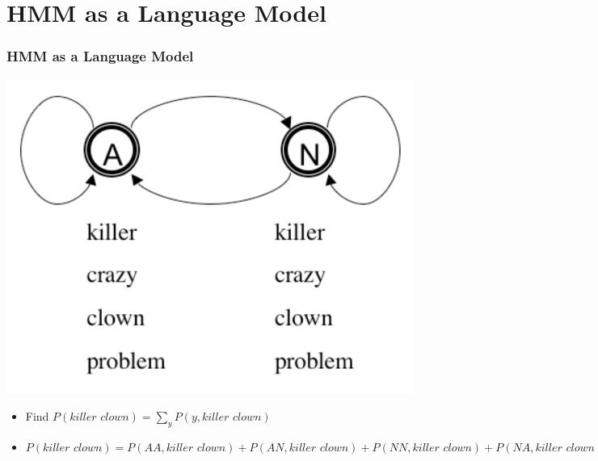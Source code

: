 \section{HMM as a Language Model}

\begin{frame}
\frametitle{HMM as a Language Model}
\begin{center}
\includegraphics[scale=.3]{figures/hmmfig}
\end{center}
\begin{itemize}[<+->]
\item Find $P(\textit{killer clown}) = \sum_y P(y, \textit{killer clown})$
\item $P(\textit{killer clown}) = P(AA, \textit{killer clown}) + P(AN, \textit{killer clown}) + P(NN, \textit{killer clown}) + P(NA, \textit{killer clown})$
\end{itemize}
\end{frame}

